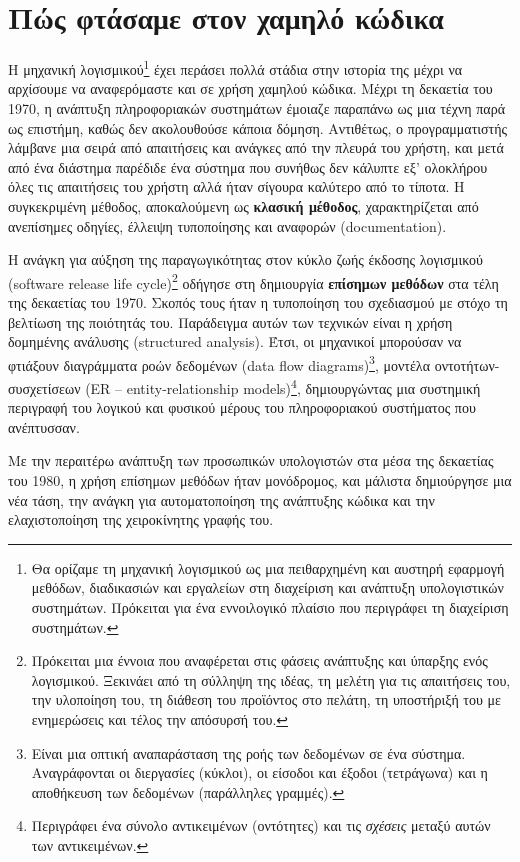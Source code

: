     \section{Πώς φτάσαμε στον χαμηλό κώδικα}
        Η μηχανική λογισμικού\footnote{Θα ορίζαμε τη μηχανική λογισμικού ως μια πειθαρχημένη και αυστηρή εφαρμογή μεθόδων, διαδικασιών και εργαλείων στη διαχείριση και ανάπτυξη υπολογιστικών συστημάτων. Πρόκειται για ένα εννοιλογικό πλαίσιο που περιγράφει τη διαχείριση συστημάτων.} έχει περάσει πολλά στάδια στην ιστορία της μέχρι να αρχίσουμε να αναφερόμαστε και σε χρήση χαμηλού κώδικα. Μέχρι τη δεκαετία του 1970, η ανάπτυξη πληροφοριακών συστημάτων έμοιαζε παραπάνω ως μια τέχνη παρά ως επιστήμη, καθώς δεν ακολουθούσε κάποια δόμηση. Αντιθέτως, ο προγραμματιστής λάμβανε μια σειρά από απαιτήσεις και ανάγκες από την πλευρά του χρήστη, και μετά από ένα διάστημα παρέδιδε ένα σύστημα που συνήθως δεν κάλυπτε εξ' ολοκλήρου όλες τις απαιτήσεις του χρήστη αλλά ήταν σίγουρα καλύτερο από το τίποτα. Η συγκεκριμένη μέθοδος, αποκαλούμενη ως \textbf{κλασική μέθοδος}, χαρακτηρίζεται από ανεπίσημες οδηγίες, έλλειψη τυποποίησης και αναφορών (documentation).

        Η ανάγκη για αύξηση της παραγωγικότητας στον κύκλο ζωής έκδοσης λογισμικού (software release life cycle)\footnote{Πρόκειται μια έννοια που αναφέρεται στις φάσεις ανάπτυξης και ύπαρξης ενός λογισμικού. Ξεκινάει από τη σύλληψη της ιδέας, τη μελέτη για τις απαιτήσεις του, την υλοποίηση του, τη διάθεση του προϊόντος στο πελάτη, τη υποστήριξή του με ενημερώσεις και τέλος την απόσυρσή του.} οδήγησε στη δημιουργία \textbf{επίσημων μεθόδων} στα τέλη της δεκαετίας του 1970. Σκοπός τους ήταν η τυποποίηση του σχεδιασμού με στόχο τη βελτίωση της ποιότητάς του. Παράδειγμα αυτών των τεχνικών είναι η χρήση δομημένης ανάλυσης (structured analysis). Έτσι, οι μηχανικοί μπορούσαν να φτιάξουν διαγράμματα ροών δεδομένων (data flow diagrams)\footnote{Είναι μια οπτική αναπαράσταση της ροής των δεδομένων σε ένα σύστημα. Αναγράφονται οι διεργασίες (κύκλοι), οι είσοδοι και έξοδοι (τετράγωνα) και η αποθήκευση των δεδομένων (παράλληλες γραμμές).}, μοντέλα οντοτήτων-συσχετίσεων (ER -- entity-relationship models)\footnote{Περιγράφει ένα σύνολο αντικειμένων (οντότητες) και τις \textit{σχέσεις} μεταξύ αυτών των αντικειμένων.}, δημιουργώντας μια συστημική περιγραφή του λογικού και φυσικού μέρους του πληροφοριακού συστήματος που ανέπτυσσαν.

        Με την περαιτέρω ανάπτυξη των προσωπικών υπολογιστών στα μέσα της δεκαετίας του 1980, η χρήση επίσημων μεθόδων ήταν μονόδρομος, και μάλιστα δημιούργησε μια νέα τάση, την ανάγκη για αυτοματοποίηση της ανάπτυξης κώδικα και την ελαχιστοποίηση της χειροκίνητης γραφής του.

